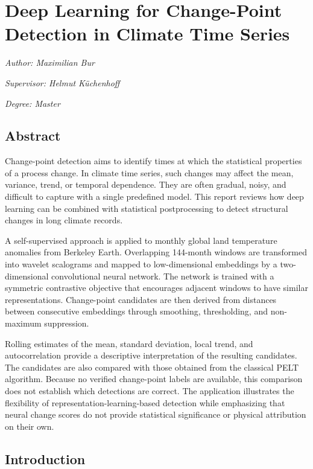 \documentclass[
]{krantz}
\begin{document}
\chapter{Deep Learning for Change-Point Detection in Climate Time Series}\label{cs}

\emph{Author: Maximilian Bur}

\emph{Supervisor: Helmut Küchenhoff}

\emph{Degree: Master}

\section{Abstract}\label{abstract-4}

Change-point detection aims to identify times at which the statistical properties of a process change. In climate time series, such changes may affect the mean, variance, trend, or temporal dependence. They are often gradual, noisy, and difficult to capture with a single predefined model. This report reviews how deep learning can be combined with statistical postprocessing to detect structural changes in long climate records.

A self-supervised approach is applied to monthly global land temperature anomalies from Berkeley Earth. Overlapping 144-month windows are transformed into wavelet scalograms and mapped to low-dimensional embeddings by a two-dimensional convolutional neural network. The network is trained with a symmetric contrastive objective that encourages adjacent windows to have similar representations. Change-point candidates are then derived from distances between consecutive embeddings through smoothing, thresholding, and non-maximum suppression.

Rolling estimates of the mean, standard deviation, local trend, and autocorrelation provide a descriptive interpretation of the resulting candidates. The candidates are also compared with those obtained from the classical PELT algorithm. Because no verified change-point labels are available, this comparison does not establish which detections are correct. The application illustrates the flexibility of representation-learning-based detection while emphasizing that neural change scores do not provide statistical significance or physical attribution on their own.

\section{Introduction}\label{introduction-6}
\end{document}
